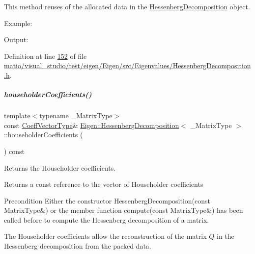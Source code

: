 This method reuses of the allocated data in the \hyperlink{group___eigenvalues___module_class_eigen_1_1_hessenberg_decomposition}{Hessenberg\+Decomposition} object.

Example\+: 
\begin{DoxyCodeInclude}
\end{DoxyCodeInclude}
 Output\+: 
\begin{DoxyVerbInclude}
\end{DoxyVerbInclude}
 

Definition at line \hyperlink{matio_2visual__studio_2test_2eigen_2_eigen_2src_2_eigenvalues_2_hessenberg_decomposition_8h_source_l00152}{152} of file \hyperlink{matio_2visual__studio_2test_2eigen_2_eigen_2src_2_eigenvalues_2_hessenberg_decomposition_8h_source}{matio/visual\+\_\+studio/test/eigen/\+Eigen/src/\+Eigenvalues/\+Hessenberg\+Decomposition.\+h}.

\mbox{\label{group___eigenvalues___module_a65fa81ce79d956baa59a30a6d82f8a84}} 
\subparagraph{\texorpdfstring{householder\+Coefficients()}{householderCoefficients()}\hspace{0.1cm}{\footnotesize\ttfamily [1/2]}}
{\footnotesize\ttfamily template$<$typename \+\_\+\+Matrix\+Type$>$ \\
const \hyperlink{group___eigenvalues___module_a567f99f3770365777b67bf9832b6fac1}{Coeff\+Vector\+Type}\& \hyperlink{group___eigenvalues___module_class_eigen_1_1_hessenberg_decomposition}{Eigen\+::\+Hessenberg\+Decomposition}$<$ \+\_\+\+Matrix\+Type $>$\+::householder\+Coefficients (\begin{DoxyParamCaption}{ }\end{DoxyParamCaption}) const\hspace{0.3cm}{\ttfamily [inline]}}



Returns the Householder coefficients. 

\begin{DoxyReturn}{Returns}
a const reference to the vector of Householder coefficients
\end{DoxyReturn}
\begin{DoxyPrecond}{Precondition}
Either the constructor Hessenberg\+Decomposition(const Matrix\+Type\&) or the member function compute(const Matrix\+Type\&) has been called before to compute the Hessenberg decomposition of a matrix.
\end{DoxyPrecond}
The Householder coefficients allow the reconstruction of the matrix $ Q $ in the Hessenberg decomposition from the packed data.

